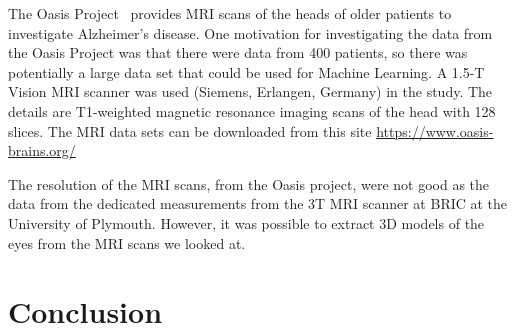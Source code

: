 \documentclass[12pt]{article}
\begin{document}
The Oasis Project~\cite{van2021mri} provides MRI scans of the heads of
older patients to investigate Alzheimer's disease.  One motivation for
investigating the data from the Oasis Project was that there were data
from 400 patients, so there was potentially a large data set that
could be used for Machine Learning.  A 1.5-T Vision MRI scanner was
used (Siemens, Erlangen, Germany) in the study.  The details are
T1-weighted magnetic resonance imaging scans of the head with 128
slices.  The MRI data sets can be downloaded from this site
\url{https://www.oasis-brains.org/}


The resolution of the MRI scans, from the Oasis project, were not good
as the data from the dedicated measurements from the 3T MRI scanner at
BRIC at the University of Plymouth. However, it was possible to
extract 3D models of the eyes from the MRI scans we looked at.



\section{Conclusion}



\end{document}
